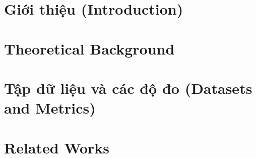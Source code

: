 \documentclass[12pt]{report}
\begin{document}

\setmainfont{Times New Roman}

\clearpage
{} 







% 
% 


\listoftables
\newpage

\listoffigures
\newpage

\listofalgorithms
{}


\chapter{Giới thiệu (Introduction)}
\label{chapter:introduction}






\chapter{Theoretical Background}
\label{chapter:theoretical}
% 
% 
% 
% 
% 
% 
% 

\chapter{Tập dữ liệu và các độ đo (Datasets and Metrics)}
\label{chapter:datasets}




\chapter{Related Works}
\label{chapter:related}
% 
% 
% 
% 
\end{document}
